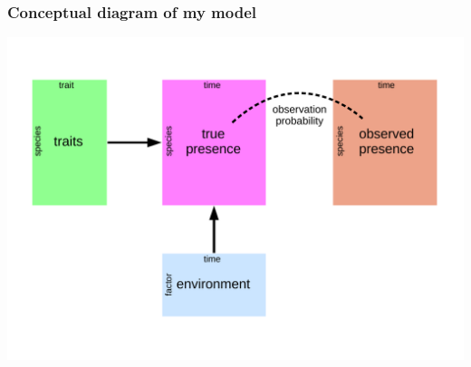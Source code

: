 \documentclass{beamer}
\begin{document}
\begin{frame}
  \frametitle{Conceptual diagram of my model}
  \begin{center}
    \includegraphics[width=\textwidth,height=0.8\textheight,keepaspectratio=true]{figure/paleo_fourth_corner}
  \end{center}
\end{frame}
\end{document}
